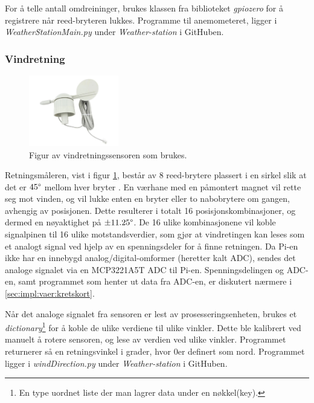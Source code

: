 For å telle antall omdreininger, brukes klassen  fra biblioteket \textit{gpiozero} for å registrere når reed-bryteren lukkes. Programme til anemometeret, ligger i \textit{WeatherStationMain.py} under \textit{Weather-station} i GitHuben\cite{GitHub}.


\newpage
\subsubsection{Vindretning}\label{sec:impl:vaer:vindret}

\begin{figure}
    \centering
    \includegraphics[width=0.35\textwidth]{implementering/vaer/vindretning.png}
    \caption{Figur av vindretningssensoren som brukes.}
    \label{fig:vindretning}
\end{figure}

Retningsmåleren, vist i figur \ref{fig:vindretning}, består av 8 reed-brytere plassert i en sirkel slik at det er $45\degree$ mellom hver bryter \cite{weather}. 
En værhane med en påmontert magnet vil rette seg mot vinden, og vil lukke enten en bryter eller to nabobrytere om gangen, avhengig av posisjonen.
Dette resulterer i totalt 16 posisjonskombinasjoner, og dermed en nøyaktighet på $\pm 11.25\degree$. 
De 16 ulike kombinasjonene vil koble signalpinen til 16 ulike motstandsverdier, som gjør at vindretingen kan leses som et analogt signal ved hjelp av en spenningsdeler for å finne retningen. 
Da Pi-en ikke har en innebygd analog/digital-omformer (heretter kalt ADC), sendes det analoge signalet via en MCP3221A5T ADC til Pi-en.
Spenningsdelingen og ADC-en, samt programmet som henter ut data fra ADC-en, er diskutert nærmere i \autoref{sec:impl:vaer:kretskort}.

Når det analoge signalet fra sensoren er lest av prosesseringsenheten, brukes et \textit{dictionary}\footnote{En type uordnet liste der man lagrer data under en nøkkel(key)\cite{dictionaries}.} for å koble de ulike verdiene til ulike vinkler.
Dette ble kalibrert ved manuelt å rotere sensoren, og lese av verdien ved ulike vinkler. 
Programmet returnerer så en retningsvinkel i grader, hvor 0\degree er definert som nord. 
Programmet ligger i \textit{windDirection.py} under \textit{Weather-station} i GitHuben\cite{GitHub}.

